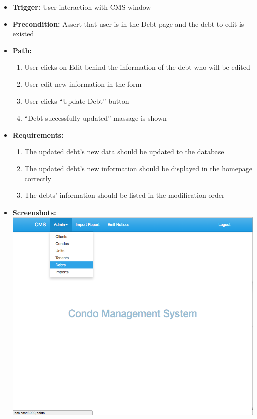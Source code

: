 \begin{itemize}
  \item[] \textbf{Trigger:} User interaction with CMS window
  \item[] \textbf{Precondition:} Assert that user is in the Debt page and the debt to edit is existed
  \item[] \textbf{Path:}
    \begin{enumerate}
      \item User clicks on Edit behind the information of the debt who will be edited
      \item User edit new information in the form
      \item User clicks ``Update Debt'' button
      \item ``Debt successfully updated'' massage is shown
    \end{enumerate}
  \item[] \textbf{Requirements:}
    \begin{enumerate}
      \item The updated debt’s new data should be updated to the database
      \item The updated debt’s new information should be displayed in the homepage correctly
      \item The debts’ information should be listed in the modification order
    \end{enumerate}
  \item[] \textbf{Screenshots:}\\
    \includegraphics[scale=0.25]{./images/ss/debt/edit/1.png}

\end{itemize}
